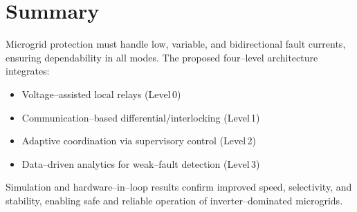 \section{Summary}
Microgrid protection must handle low, variable, and bidirectional fault currents, ensuring dependability in all modes.
The proposed four–level architecture integrates:
\begin{itemize}
    \item Voltage–assisted local relays (Level\,0)
    \item Communication–based differential/interlocking (Level\,1)
    \item Adaptive coordination via supervisory control (Level\,2)
    \item Data–driven analytics for weak–fault detection (Level\,3)
\end{itemize}
Simulation and hardware–in–loop results confirm improved speed, selectivity, and stability, enabling safe and reliable operation of inverter–dominated microgrids.






 


